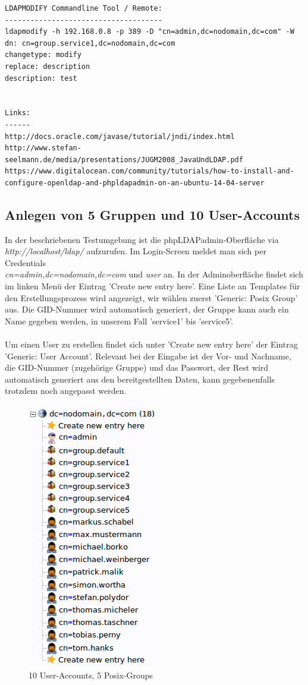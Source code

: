 \documentclass[letterpaper, 12pt]{article}
\let\tempsubsection\subsection
\renewcommand\subsection[1]{\vspace{0cm}\tempsubsection{#1}\vspace{0cm}}
\begin{document}
\newpage
\begin{lstlisting}[frame=single, caption=Grundkonfiguration]
LDAPMODIFY Commandline Tool / Remote:
-------------------------------------
ldapmodify -h 192.168.0.8 -p 389 -D "cn=admin,dc=nodomain,dc=com" -W  
dn: cn=group.service1,dc=nodomain,dc=com             
changetype: modify
replace: description
description: test


Links:
------
http://docs.oracle.com/javase/tutorial/jndi/index.html
http://www.stefan-seelmann.de/media/presentations/JUGM2008_JavaUndLDAP.pdf
https://www.digitalocean.com/community/tutorials/how-to-install-and-configure-openldap-and-phpldapadmin-on-an-ubuntu-14-04-server
\end{lstlisting}

\subsection{Anlegen von 5 Gruppen und 10 User-Accounts}
In der beschriebenen Testumgebung ist die phpLDAPadmin-Oberfläche via \textit{http://localhost/ldap/} aufzurufen. Im Login-Screen meldet man sich per Credentials \\ \textit{cn=admin,dc=nodomain,dc=com} und \textit{user} an. In der Adminoberfläche findet sich im linken Menü der Eintrag 'Create new entry here'. Eine Liste an Templates für den Erstellungsprozess wird angezeigt, wir wählen zuerst 'Generic: Posix Group' aus. Die GID-Nummer wird automatisch generiert, der Gruppe kann auch ein Name gegeben werden, in unserem Fall 'service1' bis 'service5'. \\ \\
Um einen User zu erstellen findet sich unter 'Create new entry here' der Eintrag 'Generic: User Account'. Relevant bei der Eingabe ist der Vor- und Nachname, die GID-Nummer (zugehörige Gruppe) und das Passwort, der Rest wird automatisch generiert aus den bereitgestellten Daten, kann gegebenenfalls trotzdem noch angepasst werden. \\
\begin{figure}[h]
	\centering \includegraphics[keepaspectratio=true, scale=0.65]{images/10user5groups}
	\caption{10 User-Accounts, 5 Posix-Groups}
\end{figure}
\newpage
\end{document}
